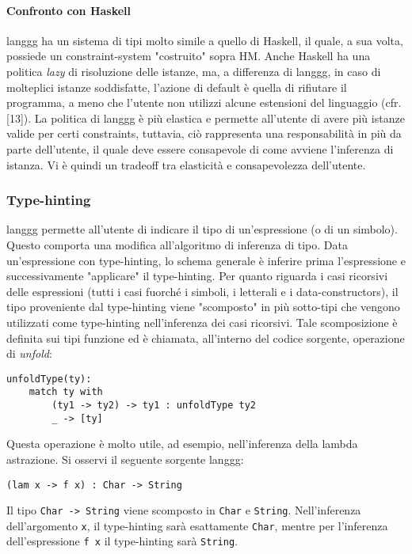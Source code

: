 \documentclass[10pt,a4paper]{article}
\begin{document}
\paragraph{Confronto con Haskell}
langgg ha un sistema di tipi molto simile a quello di Haskell, il quale, a sua volta, possiede un constraint-system
"costruito" sopra HM. Anche Haskell ha una politica \textit{lazy} di risoluzione delle istanze, ma, a differenza di langgg,
in caso di molteplici istanze soddisfatte, l'azione di default è quella di rifiutare il programma, a meno che l'utente
non utilizzi alcune estensioni del linguaggio (cfr. [13]). La politica di langgg è più elastica e permette all'utente
di avere più istanze valide per certi constraints, tuttavia, ciò rappresenta una responsabilità in più da parte
dell'utente, il quale deve essere consapevole di come avviene l'inferenza di istanza. Vi è quindi un tradeoff tra
elasticità e consapevolezza dell'utente.

\subsubsection{Type-hinting}
langgg permette all'utente di indicare il tipo di un'espressione (o di un simbolo). Questo comporta una modifica
all'algoritmo di inferenza di tipo. Data un'espressione con type-hinting, lo schema generale è inferire prima
l'espressione e successivamente "applicare" il type-hinting. Per quanto riguarda i casi ricorsivi delle espressioni
(tutti i casi fuorché i simboli, i letterali e i data-constructors), il tipo proveniente dal type-hinting viene
"scomposto" in più sotto-tipi che vengono utilizzati come type-hinting nell'inferenza dei casi ricorsivi. Tale
scomposizione è definita sui tipi funzione ed è chiamata, all'interno del codice sorgente, operazione di
\textit{unfold}:
\begin{lstlisting}
unfoldType(ty):
    match ty with
        (ty1 -> ty2) -> ty1 : unfoldType ty2
        _ -> [ty]
\end{lstlisting}
Questa operazione è molto utile, ad esempio, nell'inferenza della lambda astrazione. Si osservi il seguente sorgente
langgg:
\begin{lstlisting}
(lam x -> f x) : Char -> String
\end{lstlisting}
Il tipo \texttt{Char -> String} viene scomposto in \texttt{Char} e \texttt{String}. Nell'inferenza dell'argomento
\texttt{x}, il type-hinting sarà esattamente \texttt{Char}, mentre per l'inferenza dell'espressione \texttt{f x}
il type-hinting sarà \texttt{String}.
\end{document}
